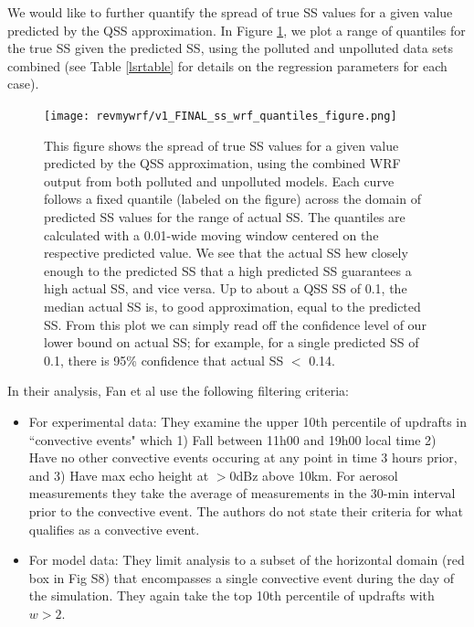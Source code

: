 \documentclass{article}
\begin{document}
We would like to further quantify the spread of true SS values for a given value predicted by the QSS approximation. In Figure \ref{wrfquantiles}, we plot a range of quantiles for the true SS given the predicted SS, using the polluted and unpolluted data sets combined (see Table \ref{lsrtable} for details on the regression parameters for each case). 
\begin{figure}[ht]
	\centering
	\texttt{[image: revmywrf/v1\_FINAL\_ss\_wrf\_quantiles\_figure.png]}
	\caption{This figure shows the spread of true SS values for a given value predicted by the QSS approximation, using the combined WRF output from both polluted and unpolluted models. Each curve follows a fixed quantile (labeled on the figure) across the domain of predicted SS values for the range of actual SS. The quantiles are calculated with a 0.01-wide moving window centered on the respective predicted value. We see that the actual SS hew closely enough to the predicted SS that a high predicted SS guarantees a high actual SS, and vice versa. Up to about a QSS SS of 0.1, the median actual SS is, to good approximation, equal to the predicted SS. From this plot we can simply read off the confidence level of our lower bound on actual SS; for example, for a single predicted SS of 0.1, there is 95\% confidence that actual SS $<$ 0.14.}
	\label{wrfquantiles}
\end{figure}

In their analysis, Fan et al use the following filtering criteria:
\begin{itemize}
	\item For experimental data: They examine the upper 10th percentile of updrafts in ``convective events" which 1) Fall between 11h00 and 19h00 local time 2) Have no other convective events occuring at any point in time 3 hours prior, and 3) Have max echo height at $>$0dBz above 10km. For aerosol measurements they take the average of measurements in the 30-min interval prior to the convective event. The authors do not state their criteria for what qualifies as a convective event.
	\item For model data: They limit analysis to a subset of the horizontal domain (red box in Fig S8) that encompasses a single convective event during the day of the simulation. They again take the top 10th percentile of updrafts with $w>2$. 
\end{itemize}
\end{document}
